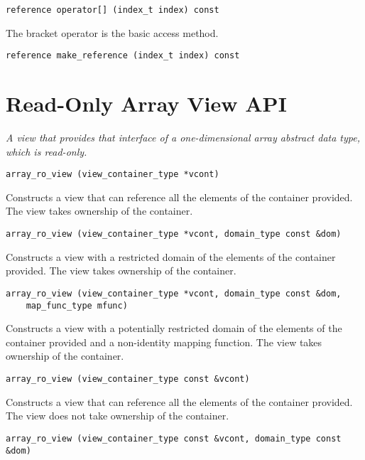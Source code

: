 \begin{verbatim}
reference operator[] (index_t index) const
\end{verbatim}

The bracket operator is the basic access method.

\begin{verbatim}
reference make_reference (index_t index) const
\end{verbatim}

\section{Read-Only Array View API } \label{sec-aryro-vw}

\emph{ A view that provides that interface of a one-dimensional array abstract data type, which is read-only.}

\begin{verbatim}
array_ro_view (view_container_type *vcont)
\end{verbatim}

Constructs a view that can reference all the elements of the container provided. The view takes ownership of the container.

\begin{verbatim}
array_ro_view (view_container_type *vcont, domain_type const &dom)
\end{verbatim}

Constructs a view with a restricted domain of the elements of the container provided. The view takes ownership of the container.

\begin{verbatim}
array_ro_view (view_container_type *vcont, domain_type const &dom,
    map_func_type mfunc)
\end{verbatim}

Constructs a view with a potentially restricted domain of the elements of the container provided and a non-identity mapping function. The view takes ownership of the container.

\begin{verbatim}
array_ro_view (view_container_type const &vcont)
\end{verbatim}

Constructs a view that can reference all the elements of the container provided. The view does not take ownership of the container.

\begin{verbatim}
array_ro_view (view_container_type const &vcont, domain_type const &dom)
\end{verbatim}

